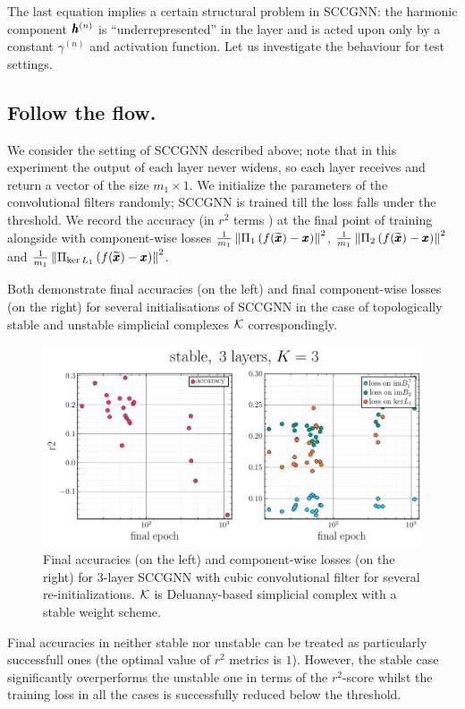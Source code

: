 \documentclass{mynotes}
\begin{document}
The last equation implies a certain structural problem in SCCGNN: the harmonic component \( \pmb{h}^{(n)}\) is ``underrepresented'' in the layer and is acted upon only by a constant \( \gamma^{(n)}\) and activation function. Let us investigate the behaviour for test settings.

\subsection{ Follow the flow. }

We consider the setting of SCCGNN described above; note that in this experiment the output of each layer never widens, so each layer receives and return a vector of the size \( m_1 \times 1 \). We initialize the parameters of the convolutional filters randomly; SCCGNN is trained till the loss falls under the threshold. We record the accuracy (in \( r^2 \) terms ) at the final point of training alongside with component-wise losses \( \frac{1}{m_1}\left\| \Pi_1 \left( f(\widetilde{\pmb{x}}) - \pmb{x} \right) \right\|^2 \), \( \frac{1}{m_1}\left\| \Pi_2 \left( f(\widetilde{\pmb{x}}) - \pmb{x} \right) \right\|^2 \) and \( \frac{1}{m_1}\left\| \Pi_{\ker L_1} \left( f(\widetilde{\pmb{x}}) - \pmb{x} \right) \right\|^2 \).

Both  demonstrate final accuracies (on the left) and final component-wise losses (on the right) for several initialisations of SCCGNN in the case of topologically stable and unstable simplicial complexes \( \mathcal{K} \) correspondingly.
\begin{figure}[htbp]
      \vspace{-20pt}
      \centering
      \includegraphics*[width=0.9\columnwidth]{imgs/stop_time_stable_clean2_r2.pdf}\vspace{-10pt}
      \caption{ 
            Final accuracies (on the left) and component-wise losses (on the right) for 3-layer SCCGNN with cubic convolutional filter for several re-initializations. \( \mathcal{K} \) is Deluanay-based simplicial complex with a stable weight scheme.
      \label{fig:repeats_first_stable}
      }
\end{figure}
Final accuracies in neither stable nor unstable can be treated as particularly successfull ones (the optimal value of \( r^2\) metrics is \( 1 \)). However, the stable case significantly overperforms the unstable one in terms of the \(r^2\)-score whilst the training loss in all the cases is successfully reduced below the threshold.
\end{document}
